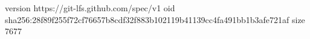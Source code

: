 version https://git-lfs.github.com/spec/v1
oid sha256:28f89f255f72cf76657b8cdf32f883b102119b41139cc4fa491bb1b3afe721af
size 7677
